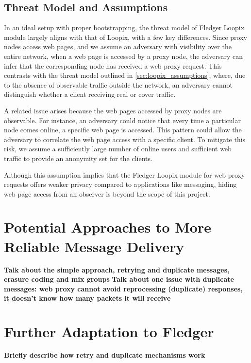 \documentclass[a4paper,11pt,oneside]{report}
\begin{document}
\subsection{Threat Model and Assumptions}

In an ideal setup with proper bootstrapping, the threat model of Fledger Loopix module largely aligns with that of Loopix, with a few key differences. Since proxy nodes access web pages, and we assume an adversary with visibility over the entire network, when a web page is accessed by a proxy node, the adversary can infer that the corresponding node has received a web proxy request. This contrasts with the threat model outlined in \autoref{sec:loopix_assumptions}, where, due to the absence of observable traffic outside the network, an adversary cannot distinguish whether a client receiving real or cover traffic.

A related issue arises because the web pages accessed by proxy nodes are observable. For instance, an adversary could notice that every time a particular node comes online, a specific web page is accessed. This pattern could allow the adversary to correlate the web page access with a specific client. To mitigate this risk, we assume a sufficiently large number of online users and sufficient web traffic to provide an anonymity set for the clients.

Although this assumption implies that the Fledger Loopix module for web proxy requests offers weaker privacy compared to applications like messaging, hiding web page access from an observer is beyond the scope of this project.

\section{Potential Approaches to More Reliable Message Delivery}
\label{sec:reliable_message_delivery}
\textbf{Talk about the simple approach, retrying and duplicate messages, erasure coding and mix groups}
\textbf{Talk about one issue with duplicate messages: web proxy cannot avoid reprocessing (duplicate) responses, it doesn't know how many packets it will receive}

\section{Further Adaptation to Fledger}
\textbf{Briefly describe how retry and duplicate mechanisms work}
\end{document}

